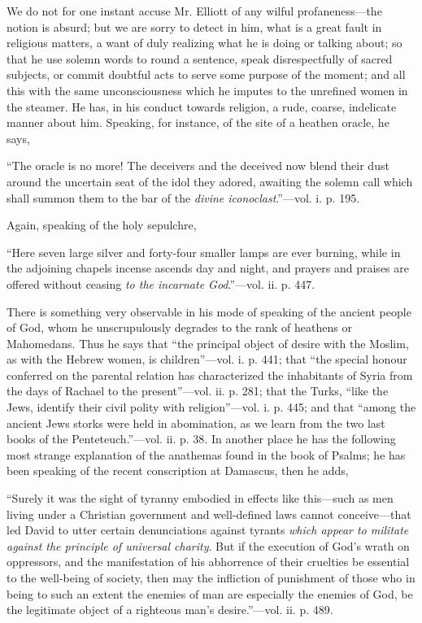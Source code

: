 We do not
for one instant accuse Mr. Elliott of any wilful profaneness—the
notion is absurd; but we are sorry to detect in him, what is a great
fault in religious matters, a want of duly realizing what he is doing or
talking about; so that he use solemn words to round a sentence, speak
disrespectfully of sacred subjects, or commit doubtful acts to serve
some purpose of the moment; and all this with the same unconsciousness
which he imputes to the unrefined women in the steamer. He has, in his
conduct towards religion, a rude, coarse, indelicate manner about him.
Speaking, for instance, of the site of a heathen oracle, he says,

``The
oracle is no more! The deceivers and the deceived now blend their dust
around the uncertain seat of the idol they adored, awaiting the solemn
call which shall summon them to the bar of the \emph{divine iconoclast}.''—vol.
i. p. 195.

Again,
speaking of the holy sepulchre,

``Here
seven large silver and forty-four smaller lamps are ever burning, while
in the adjoining chapels incense ascends day and night, and prayers and
praises are offered without ceasing \emph{to the incarnate God}.''—vol.
ii. p. 447.

There is
something very observable in his mode of speaking of the ancient people
of God, whom he unscrupulously degrades to the rank of heathens or
Mahomedans. Thus he says that ``the principal object of desire with the
Moslim, as with the Hebrew women, is children''—vol. i. p. 441; that ``the
special honour conferred on the parental relation has characterized the
inhabitants of Syria from the days of Rachael to the present''—vol. ii.
p. 281; that the Turks, ``like the Jews, identify their civil polity with
religion''—vol. i. p. 445; and that ``among the ancient Jews
storks were held in abomination, as we learn from the two last books of
the Penteteuch.''—vol. ii. p. 38. In another place he has the following
most strange explanation of the anathemas found in the book of Psalms;
he has been speaking of the recent conscription at Damascus, then he
adds,

``Surely
it was the sight of tyranny embodied in effects like this—such as men
living under a Christian government and well-defined laws cannot
conceive—that led David to utter certain denunciations against tyrants
\emph{which appear to militate against the principle of universal charity}.
But if the execution of God's wrath on oppressors, and the manifestation
of his abhorrence of their cruelties be essential to the well-being of
society, then may the infliction of punishment of those who in being to
such an extent the enemies of man are especially the enemies of God, be
the legitimate object of a righteous man's desire.''—vol. ii. p. 489.

